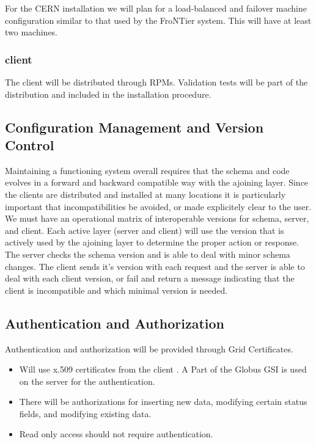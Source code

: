 \documentclass{cmspaper}
\begin{document}
 For the CERN installation we will plan for a load-balanced and failover machine configuration similar to that used by the FroNTier system. This will have at least two machines.
\subsubsection{client}
The client will be distributed through RPMs. Validation tests will be part of the distribution and included in the installation procedure.

\subsection{Configuration Management and Version Control}
Maintaining a functioning system overall requires that the schema and code evolves in a  forward and backward compatible way with the ajoining layer. Since the clients are distributed and installed at many locations it is particularly important that incompatibilities be avoided, or made explicitely clear to the user.
We must have an operational matrix of interoperable versions for schema, server, and client.  Each active layer (server and client) will use the version that is actively used by the ajoining layer to determine the proper action or response. The server checks the schema version and is able to deal with minor schema changes.  The client sends it's version with each request and the server is able to deal with each client version, or fail and return a message indicating that the client is incompatible and which minimal version is needed.

   \subsection{Authentication and Authorization}
Authentication and authorization will be provided through Grid Certificates.
\begin{itemize}
      \item Will use x.509 certificates from the client . A Part of the Globus GSI is used on the server for the authentication.
      \item There will be authorizations for inserting new data, modifying certain status fields, and modifying existing data.
      \item Read only access should not require authentication.
\end{itemize}
\end{document}
